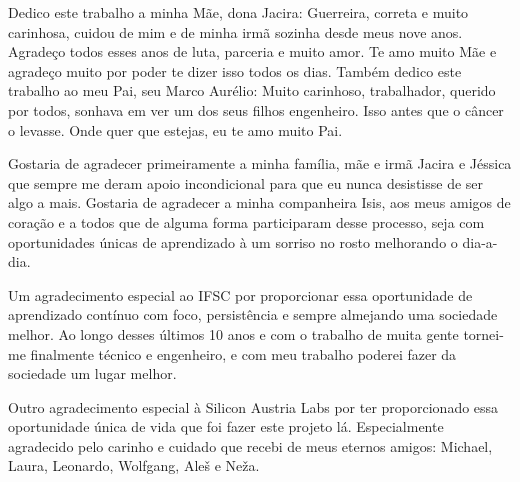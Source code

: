 \documentclass{ifscTCC} %
\begin{document}
\begin{dedicatoria}

    \vspace*{\fill}
        Dedico este trabalho a minha Mãe, dona Jacira: Guerreira, correta e muito carinhosa, cuidou de mim e de minha irmã sozinha desde meus nove anos. Agradeço todos esses anos de luta, parceria e muito amor. Te amo muito Mãe e agradeço muito por poder te dizer isso todos os dias. Também dedico este trabalho ao meu Pai, seu Marco Aurélio: Muito carinhoso, trabalhador, querido por todos, sonhava em ver um dos seus filhos engenheiro. Isso antes que o câncer o levasse. Onde quer que estejas, eu te amo muito Pai.
    \vspace*{\fill}
    
\end{dedicatoria}


\begin{agradecimentos}[AGRADECIMENTOS]
        Gostaria de agradecer primeiramente a minha família, mãe e irmã Jacira e Jéssica que sempre me deram apoio incondicional para que eu nunca desistisse de ser algo a mais. Gostaria de agradecer a minha companheira Isis, aos meus amigos de coração e a todos que de alguma forma participaram desse processo, seja com oportunidades únicas de aprendizado à um sorriso no rosto melhorando o dia-a-dia.
        
        Um agradecimento especial ao IFSC por proporcionar essa oportunidade de aprendizado contínuo com foco, persistência e sempre almejando uma sociedade melhor. Ao longo desses últimos 10 anos e com o trabalho de muita gente tornei-me finalmente técnico e engenheiro, e com meu trabalho poderei fazer da sociedade um lugar melhor.
        
        Outro agradecimento especial à Silicon Austria Labs por ter proporcionado essa oportunidade única de vida que foi fazer este projeto lá. Especialmente agradecido pelo carinho e cuidado que recebi de meus eternos amigos: Michael, Laura, Leonardo, Wolfgang, Aleš e Neža.

\end{agradecimentos}


%	
%    
\end{document}
